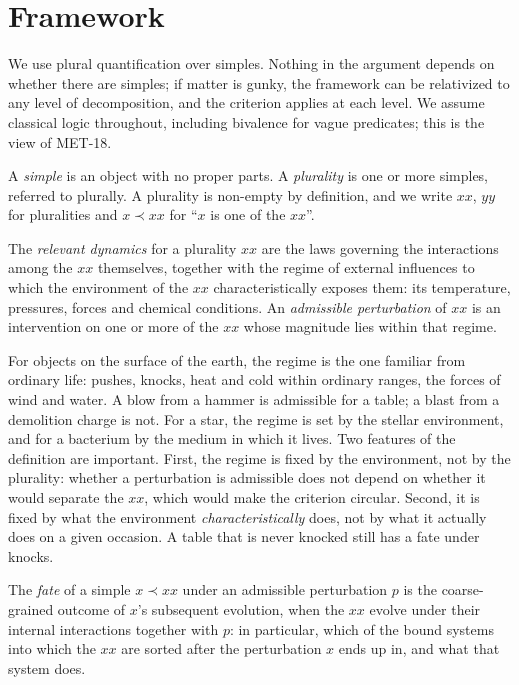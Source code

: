 \documentclass{situationist-preprint}
\begin{document}
\section{Framework}

We use plural quantification over simples. Nothing in the argument depends on whether there are simples; if matter is gunky, the framework can be relativized to any level of decomposition, and the criterion applies at each level. We assume classical logic throughout, including bivalence for vague predicates; this is the view of MET-18.

\begin{definition}\label{d:plur}
A \emph{simple} is an object with no proper parts. A \emph{plurality} is one or more simples, referred to plurally. A plurality is non-empty by definition, and we write $xx$, $yy$ for pluralities and $x \prec xx$ for \enquote{$x$ is one of the $xx$}.
\end{definition}

\begin{definition}\label{d:adm}
The \emph{relevant dynamics} for a plurality $xx$ are the laws governing the interactions among the $xx$ themselves, together with the regime of external influences to which the environment of the $xx$ characteristically exposes them: its temperature, pressures, forces and chemical conditions. An \emph{admissible perturbation} of $xx$ is an intervention on one or more of the $xx$ whose magnitude lies within that regime.
\end{definition}

For objects on the surface of the earth, the regime is the one familiar from ordinary life: pushes, knocks, heat and cold within ordinary ranges, the forces of wind and water. A blow from a hammer is admissible for a table; a blast from a demolition charge is not. For a star, the regime is set by the stellar environment, and for a bacterium by the medium in which it lives. Two features of the definition are important. First, the regime is fixed by the environment, not by the plurality: whether a perturbation is admissible does not depend on whether it would separate the $xx$, which would make the criterion circular. Second, it is fixed by what the environment \emph{characteristically} does, not by what it actually does on a given occasion. A table that is never knocked still has a fate under knocks.

\begin{definition}[Fate]\label{d:fate}
The \emph{fate} of a simple $x \prec xx$ under an admissible perturbation $p$ is the coarse-grained outcome of $x$'s subsequent evolution, when the $xx$ evolve under their internal interactions together with $p$: in particular, which of the bound systems into which the $xx$ are sorted after the perturbation $x$ ends up in, and what that system does.
\end{definition}
\end{document}
